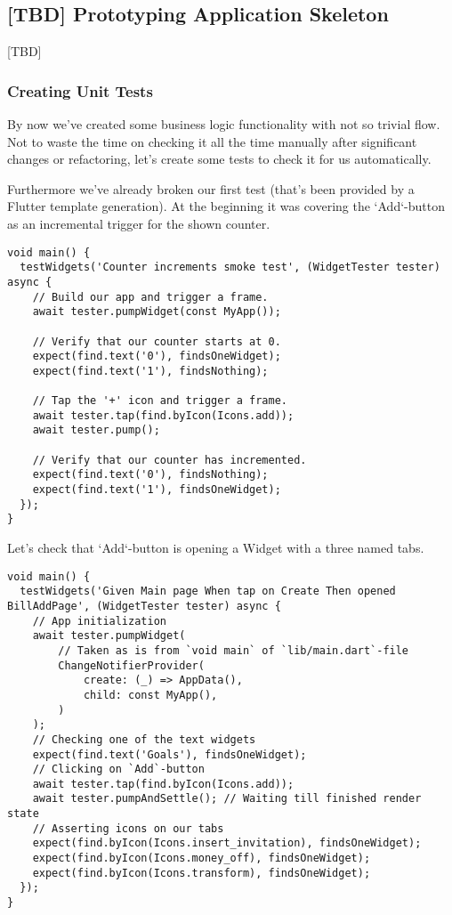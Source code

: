 
\subsection{[TBD] Prototyping Application Skeleton}

[TBD]

\subsubsection{Creating Unit Tests}

By now we've created some business logic functionality with not so trivial flow. Not to waste the time on checking it
all the time manually after significant changes or refactoring, let's create some tests to check it for us automatically.

Furthermore we've already broken our first test (that's been provided by a Flutter template generation). At the 
beginning it was covering the `Add`-button as an incremental trigger for the shown counter.

\begin{lstlisting}
void main() {
  testWidgets('Counter increments smoke test', (WidgetTester tester) async {
    // Build our app and trigger a frame.
    await tester.pumpWidget(const MyApp());

    // Verify that our counter starts at 0.
    expect(find.text('0'), findsOneWidget);
    expect(find.text('1'), findsNothing);

    // Tap the '+' icon and trigger a frame.
    await tester.tap(find.byIcon(Icons.add));
    await tester.pump();

    // Verify that our counter has incremented.
    expect(find.text('0'), findsNothing);
    expect(find.text('1'), findsOneWidget);
  });
}
\end{lstlisting}

\noindent Let's check that `Add`-button is opening a Widget with a three named tabs.

\begin{lstlisting}
void main() {
  testWidgets('Given Main page When tap on Create Then opened BillAddPage', (WidgetTester tester) async {
    // App initialization
    await tester.pumpWidget(
        // Taken as is from `void main` of `lib/main.dart`-file
        ChangeNotifierProvider(
            create: (_) => AppData(),
            child: const MyApp(),
        )
    );
    // Checking one of the text widgets
    expect(find.text('Goals'), findsOneWidget);
    // Clicking on `Add`-button
    await tester.tap(find.byIcon(Icons.add));
    await tester.pumpAndSettle(); // Waiting till finished render state
    // Asserting icons on our tabs
    expect(find.byIcon(Icons.insert_invitation), findsOneWidget);
    expect(find.byIcon(Icons.money_off), findsOneWidget);
    expect(find.byIcon(Icons.transform), findsOneWidget);
  });
}
\end{lstlisting}

